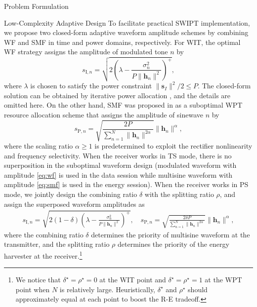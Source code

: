 \documentclass[journal,12pt,onecolumn,draftclsnofoot]{IEEEtran}
\begin{document}
\begin{section}{Problem Formulation}
		\begin{subsection}{Low-Complexity Adaptive Design}
			To facilitate practical SWIPT implementation, we propose two closed-form adaptive waveform amplitude schemes by combining WF and SMF in time and power domains, respectively. For WIT, the optimal WF strategy assigns the amplitude of modulated tone $n$ by
			\begin{equation}\label{eq:wf}
				s_{\mathrm{I}, n} = \sqrt{2\left(\lambda - \frac{\sigma_n^2}{P \lVert{\boldsymbol{h}_n}\rVert^2}\right)^+},
			\end{equation}
			where $\lambda$ is chosen to satisfy the power constraint $\lVert{\boldsymbol{s}_I}\rVert^2 / 2 \le P$. The closed-form solution can be obtained by iterative power allocation \cite{Tse2005}, and the details are omitted here. On the other hand, SMF was proposed in \cite{Clerckx2017} as a suboptimal WPT resource allocation scheme that assigns the amplitude of sinewave $n$ by
			\begin{equation}\label{eq:smf}
				s_{\mathrm{P}, n} = \sqrt{\frac{2 P}{\sum_{n=1}^N \lVert{\boldsymbol{h}_n \rVert^{2 \alpha}}}}\lVert{\boldsymbol{h}_n}\rVert^\alpha,
			\end{equation}
			where the scaling ratio $\alpha \ge 1$ is predetermined to exploit the rectifier nonlinearity and frequency selectivity. When the receiver works in TS mode, there is no superposition in the suboptimal waveform design (modulated waveform with amplitude \eqref{eq:wf} is used in the data session while multisine waveform with amplitude \eqref{eq:smf} is used in the energy session). When the receiver works in PS mode, we jointly design the combining ratio $\delta$ with the splitting ratio $\rho$, and assign the superposed waveform amplitudes as
			\begin{align}
				s_{\mathrm{I}, n} = \sqrt{2(1 - \delta)\left(\lambda - \frac{\sigma_n^2}{P \lVert{\boldsymbol{h}_n}\rVert^2}\right)^+}, \quad s_{\mathrm{P}, n} = \sqrt{\frac{2 \delta P}{\sum_{n=1}^N \lVert{\boldsymbol{h}_n \rVert^{2 \alpha}}}}\lVert{\boldsymbol{h}_n}\rVert^\alpha, \label{eq:s_ip}
			\end{align}
			where the combining ratio $\delta$ determines the priority of multisine waveform at the transmitter, and the splitting ratio $\rho$ determines the priority of the energy harvester at the receiver.\footnote{We notice that $\delta^{\star}=\rho^{\star}=0$ at the WIT point and $\delta^{\star}=\rho^{\star}=1$ at the WPT point when $N$ is relatively large. Heuristically, $\delta^{\star}$ and $\rho^{\star}$ should approximately equal at each point to boost the R-E tradeoff.}


\end{subsection}
\end{section}
\end{document}
